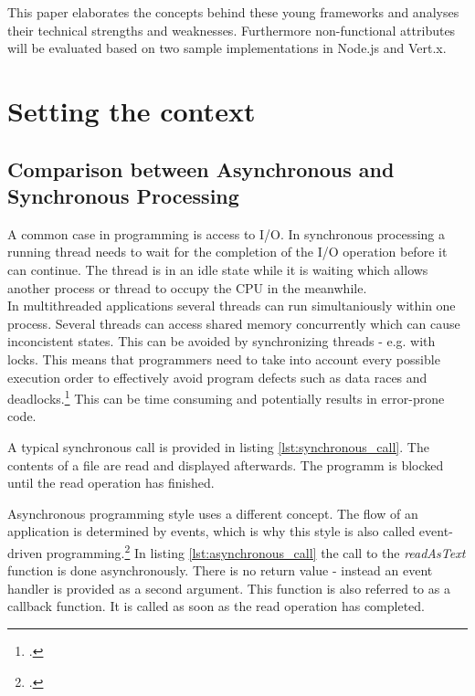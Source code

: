 This paper elaborates the concepts behind these young frameworks and analyses their 
technical strengths and weaknesses. Furthermore non-functional attributes will be
evaluated based on two sample implementations in Node.js  and Vert.x.

\section{Setting the context}
\label{setting_the_context}

\subsection{Comparison between Asynchronous and Synchronous Processing}
\label{comparison}

A common case in programming is access to I/O.
In synchronous processing a running thread needs to wait for the completion of
the I/O operation before it can continue.
The thread is in an idle state while it is waiting which allows another process 
or thread to occupy the CPU in the meanwhile.\\

In multithreaded applications several threads can run simultaniously within one 
process. Several threads can access shared memory concurrently which can
cause inconcistent states. This can be avoided by synchronizing threads - e.g.
with locks. This means that programmers need to take into account every possible
execution order to effectively avoid program defects such as data races and 
deadlocks.\footcite[Cf.][10]{Breshears_2009}
This can be time consuming and potentially results in error-prone code.

A typical synchronous call is provided in listing \ref{lst:synchronous_call}. The
contents of a file are read and displayed afterwards. The programm is blocked until the
read operation has finished.




Asynchronous programming style uses a different concept. The flow of an
application is determined by events, which is why this style is also called
event-driven programming.\footcite[Cf.][16]{teixeira_2012} In listing \ref{lst:asynchronous_call} the call
to the \textit{readAsText} function is done asynchronously. There is no
return value - instead an event handler is provided as a second argument.
This function is also referred to as a callback function. It is called
as soon as the read operation has completed.

